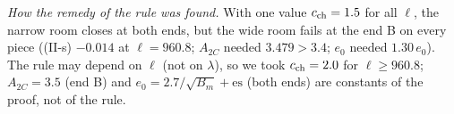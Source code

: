 \emph{How the remedy of the rule was found.}
With one value $c_{\rm ch}=1.5$ for all $\ell$, the narrow room closes at both ends, but the wide room fails at the end B on every piece ((II-s) $-0.014$ at $\ell=960.8$; $A_{2C}$ needed $3.479>3.4$; $e_0$ needed $1.30\,e_0$).
The rule may depend on $\ell$ (not on $\lambda$), so we took $c_{\rm ch}=2.0$ for $\ell\ge960.8$; $A_{2C}=3.5$ (end B) and $e_0=2.7/\sqrt{B_m}+\mathrm{es}$ (both ends) are constants of the proof, not of the rule.
